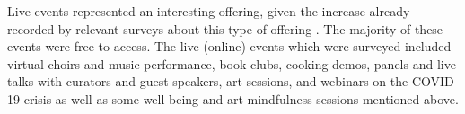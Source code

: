 \documentclass{egpubl}
\begin{document}
Live events represented an interesting offering, given the increase already recorded by relevant surveys about this type of offering \cite{InternationalCouncilofMuseums2020b}. The majority of these events were free to access. The live (online) events which were surveyed included virtual choirs and music performance, book clubs, cooking demos, panels and live talks with curators and guest speakers, art sessions, and webinars on the COVID-19 crisis as well as some well-being and art mindfulness sessions mentioned above.







 








\end{document}
